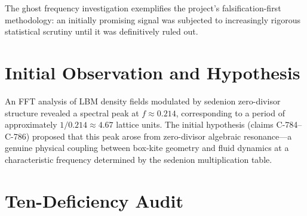 \documentclass[12pt,openany]{report}
\theoremstyle{definition}
\theoremstyle{plain}
\theoremstyle{remark}
\begin{document}
The ghost frequency investigation exemplifies the project's
falsification-first methodology: an initially promising signal was
subjected to increasingly rigorous statistical scrutiny until it was
definitively ruled out.

\section{Initial Observation and Hypothesis}

An FFT analysis of LBM density fields modulated by sedenion zero-divisor
structure revealed a spectral peak at $f \approx 0.214$, corresponding
to a period of approximately $1/0.214 \approx 4.67$ lattice units.
The initial hypothesis (claims C-784--C-786) proposed that this peak
arose from zero-divisor algebraic resonance---a genuine physical
coupling between box-kite geometry and fluid dynamics at a
characteristic frequency determined by the sedenion multiplication table.

\section{Ten-Deficiency Audit}
\end{document}
